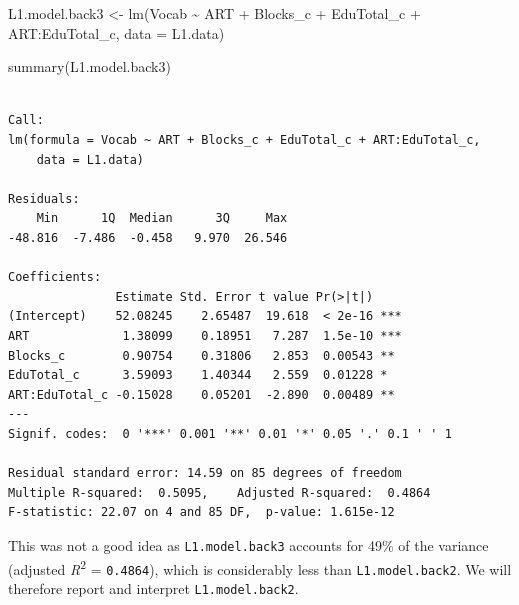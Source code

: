\documentclass[
  letterpaper,
  DIV=11,
  numbers=noendperiod]{scrreprt}
\newenvironment{Shaded}{\begin{snugshade}}{\end{snugshade}}
\newcommand{\AttributeTok}[1]{\textcolor[rgb]{0.40,0.45,0.13}{#1}}
\newcommand{\FunctionTok}[1]{\textcolor[rgb]{0.28,0.35,0.67}{#1}}
\newcommand{\NormalTok}[1]{\textcolor[rgb]{0.00,0.23,0.31}{#1}}
\newcommand{\OtherTok}[1]{\textcolor[rgb]{0.00,0.23,0.31}{#1}}
\newcommand{\SpecialCharTok}[1]{\textcolor[rgb]{0.37,0.37,0.37}{#1}}
\begin{document}
\begin{Shaded}
\begin{Highlighting}[]
\NormalTok{L1.model.back3 }\OtherTok{\textless{}{-}} \FunctionTok{lm}\NormalTok{(Vocab }\SpecialCharTok{\textasciitilde{}}\NormalTok{ ART }\SpecialCharTok{+}\NormalTok{ Blocks\_c }\SpecialCharTok{+}\NormalTok{ EduTotal\_c }\SpecialCharTok{+}\NormalTok{ ART}\SpecialCharTok{:}\NormalTok{EduTotal\_c, }
           \AttributeTok{data =}\NormalTok{ L1.data)}

\FunctionTok{summary}\NormalTok{(L1.model.back3)}
\end{Highlighting}
\end{Shaded}

\begin{verbatim}

Call:
lm(formula = Vocab ~ ART + Blocks_c + EduTotal_c + ART:EduTotal_c, 
    data = L1.data)

Residuals:
    Min      1Q  Median      3Q     Max 
-48.816  -7.486  -0.458   9.970  26.546 

Coefficients:
               Estimate Std. Error t value Pr(>|t|)    
(Intercept)    52.08245    2.65487  19.618  < 2e-16 ***
ART             1.38099    0.18951   7.287  1.5e-10 ***
Blocks_c        0.90754    0.31806   2.853  0.00543 ** 
EduTotal_c      3.59093    1.40344   2.559  0.01228 *  
ART:EduTotal_c -0.15028    0.05201  -2.890  0.00489 ** 
---
Signif. codes:  0 '***' 0.001 '**' 0.01 '*' 0.05 '.' 0.1 ' ' 1

Residual standard error: 14.59 on 85 degrees of freedom
Multiple R-squared:  0.5095,    Adjusted R-squared:  0.4864 
F-statistic: 22.07 on 4 and 85 DF,  p-value: 1.615e-12
\end{verbatim}

This was not a good idea as \texttt{L1.model.back3} accounts for 49\% of
the variance (adjusted \emph{R}\textsuperscript{2} = \texttt{0.4864}),
which is considerably less than \texttt{L1.model.back2}. We will
therefore report and interpret \texttt{L1.model.back2}.
\end{document}
